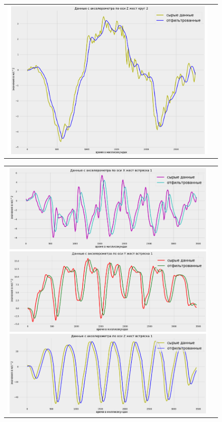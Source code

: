 \begin{figure}[H]
    \begin{center}
        \begin{tabular}{cc}
            \includegraphics[width=1\textwidth]{farim/cirzres.png} & 
        \end{tabular}
    \end{center}
\end{figure}

\begin{figure}[H]
    \begin{center}
        \begin{tabular}{cc}
            \includegraphics[width=1\textwidth]{farim/shak.png} & 
        \end{tabular}
    \end{center}
\end{figure}